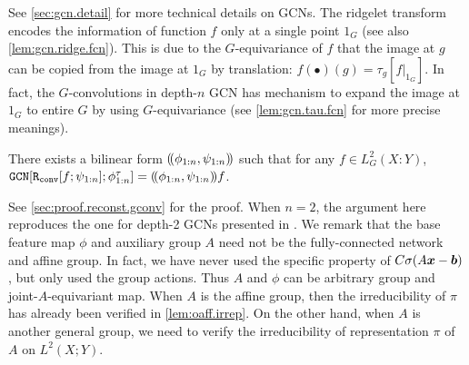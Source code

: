 See \cref{sec:gcn.detail} for more technical details on GCNs. 
The ridgelet transform encodes the information of function $f$ only at a single point $1_G$ (see also \cref{lem:gcn.ridge.fcn}). This is due to the $G$-equivariance of $f$ that the image at $g$ can be copied from the image at $1_G$ by translation: $f(\bullet)(g) = \tau_g[f|_{1_G}]$. In fact, the $G$-convolutions in depth-$n$ GCN has mechanism to expand the image at $1_G$ to entire $G$ by using $G$-equivariance (see \cref{lem:gcn.tau.fcn} for more precise meanings).

\begin{theorem} \label{thm:reconst.gconv}
There exists a bilinear form $(\!(\phi_{1:n},\psi_{1:n})\!)$ such that
for any $f \in L^2_G(X:Y)$, $\mathtt{GCN}[ \mathtt{R_{conv}}[f;\psi_{1:n}];\phi^\tau_{1:n} ] = (\!(\phi_{1:n},\psi_{1:n})\!)f$.
\end{theorem}
See \cref{sec:proof.reconst.gconv} for the proof.
When $n=2$, the argument here reproduces the one for depth-2 GCNs presented in \citet{Sonoda2022gconv}.
We remark that the base feature map $\phi$ and auxiliary group $A$ need not be the fully-connected network and affine group. 
In fact, we have never used the specific property of $C \sigma( A\bm{x}-\bm{b} )$, but only used the group actions. Thus $A$ and $\phi$ can be arbitrary group and joint-$A$-equivariant map. When $A$ is the affine group, then the irreducibility of $\pi$ has already been verified in \ref{lem:oaff.irrep}. On the other hand, when $A$ is another general group, we need to verify the irreducibility of representation $\pi$ of $A$ on $L^2(X;Y)$.




